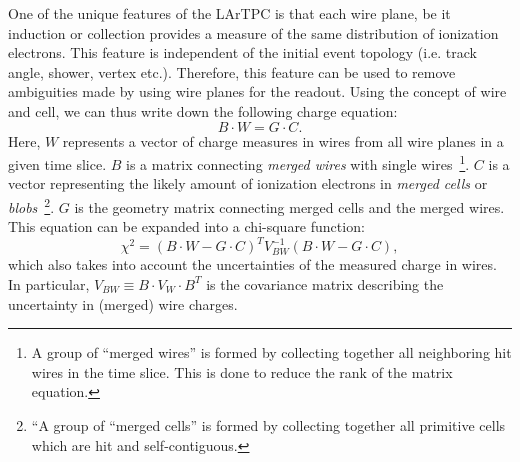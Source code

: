 One of the unique features of the LArTPC is that each wire plane, be it induction or 
collection provides a measure of the same distribution of ionization electrons.
This 
feature is independent of the initial event topology (i.e. track angle, shower, vertex etc.). 
Therefore, this feature can be used to remove ambiguities made by using wire planes for the 
readout. Using the concept of wire and cell, we can thus write down the following charge 
equation:
\begin{equation}\label{eq:charge}
B\cdot W = G\cdot C.
\end{equation}
Here, $W$ represents a vector of charge measures in wires from all wire planes in a given time slice. 
$B$ is a matrix connecting \textit{merged wires} with single wires~\footnote{A group of ``merged wires'' is formed by collecting together all neighboring hit wires in the time slice.  This is done to reduce the rank of the matrix equation.}.
$C$ is a vector representing the likely amount of ionization electrons in \textit{merged cells} or \textit{blobs}~\footnote{``A group of ``merged cells'' is formed by collecting together all primitive cells which are hit and self-contiguous.}.  $G$ is the geometry 
matrix connecting merged cells and the merged wires. This equation can be expanded into 
a chi-square function:
\begin{equation}\label{eq:chi2}
\chi^2 = \left( B\cdot W - G\cdot C \right)^T V_{BW}^{-1} \left(B\cdot W - G\cdot C\right),
\end{equation}
which also takes into account the uncertainties of the measured charge in 
wires. In particular, $V_{BW} \equiv B \cdot V_{W} \cdot B^{T}$ is the 
covariance matrix describing the uncertainty in (merged) wire 
charges. 

